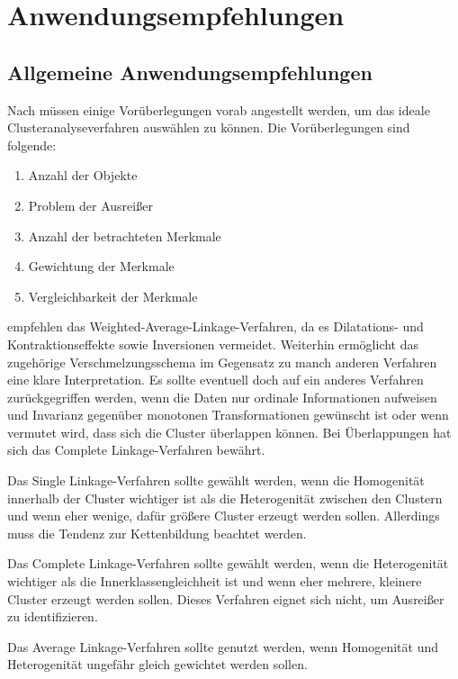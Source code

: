 \chapter{Anwendungsempfehlungen}

\section{Allgemeine Anwendungsempfehlungen}

Nach \citet[S. 510]{Backhaus.2016} müssen einige Vorüberlegungen vorab angestellt werden, um das ideale Clusteranalyseverfahren auswählen zu können. Die Vorüberlegungen sind folgende:
\begin{enumerate}
    \item Anzahl der Objekte
    \item Problem der Ausreißer
    \item Anzahl der betrachteten Merkmale
    \item Gewichtung der Merkmale
    \item Vergleichbarkeit der Merkmale
\end{enumerate}

\citet[S. 275]{Bacher.2010} empfehlen das Weighted-Average-Linkage-Verfahren, da es Dilatations- und Kontraktionseffekte sowie Inversionen vermeidet. Weiterhin ermöglicht das zugehörige Verschmelzungsschema im Gegensatz zu manch anderen Verfahren eine klare Interpretation. Es sollte eventuell doch auf ein anderes Verfahren zurückgegriffen werden, wenn die Daten nur ordinale Informationen aufweisen und Invarianz gegenüber monotonen Transformationen gewünscht ist oder wenn vermutet wird, dass sich die Cluster überlappen können. Bei Überlappungen hat sich das Complete Linkage-Verfahren bewährt.

Das Single Linkage-Verfahren sollte gewählt werden, wenn die Homogenität innerhalb der Cluster wichtiger ist als die Heterogenität zwischen den Clustern und wenn eher wenige, dafür größere Cluster erzeugt werden sollen. Allerdings muss die Tendenz zur Kettenbildung beachtet werden.

Das Complete Linkage-Verfahren sollte gewählt werden, wenn die Heterogenität wichtiger als die Innerklassengleichheit ist und wenn eher mehrere, kleinere Cluster erzeugt werden sollen. Dieses Verfahren eignet sich nicht, um Ausreißer zu identifizieren.

Das Average Linkage-Verfahren sollte genutzt werden, wenn Homogenität und Heterogenität ungefähr gleich gewichtet werden sollen.

